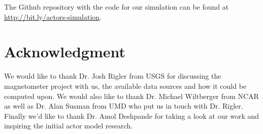 \documentclass[conference,twocolumn,11pt]{IEEEtran}
\begin{document}

The Github repository with the code for our simulation can be found at \url{http://bit.ly/actors-simulation}.



\section*{Acknowledgment}
We would like to thank Dr. Josh Rigler from USGS for discussing the magnetometer project with us, the available data sources and how it could be computed upon. We would also like to thank Dr. Michael Wiltberger from NCAR as well as Dr. Alan Susman from UMD who put us in touch with Dr. Rigler. Finally we'd like to thank Dr. Amol Deshpande for taking a look at our work and inspiring the initial actor model research.






\end{document}
